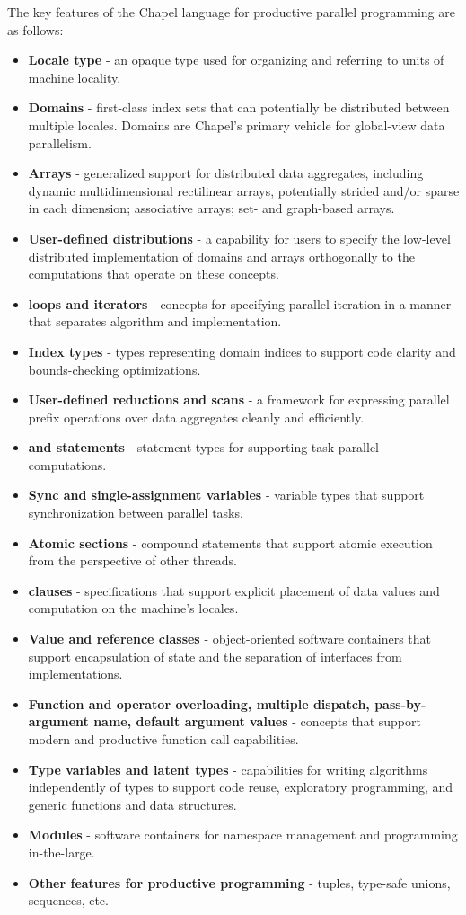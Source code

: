 The key features of the Chapel language for productive parallel programming are as 
follows: 
\begin{itemize}
\item {\bf Locale type} - an opaque type used for organizing and referring to 
units of machine locality.
\item {\bf Domains} - first-class index sets that can potentially be distributed 
between multiple locales.  Domains are Chapel's primary vehicle for global-view 
data parallelism.
\item {\bf Arrays} - generalized support for distributed data aggregates, including 
dynamic multidimensional rectilinear arrays, potentially strided and/or sparse 
in each dimension; associative arrays; set- and graph-based arrays.
\item {\bf User-defined distributions} - a capability for users to specify the 
low-level distributed implementation of domains and arrays orthogonally 
to the computations that operate on these concepts.
\item {\bf {} loops and iterators} - concepts for specifying parallel 
iteration in a manner that separates algorithm and implementation.
\item {\bf Index types} - types representing domain indices to support code 
clarity and bounds-checking optimizations.    
\item {\bf User-defined reductions and scans} - a framework for expressing parallel 
prefix operations over data aggregates cleanly and efficiently.
\item {\bf {} and  statements} - statement types for 
supporting task-parallel computations.
\item {\bf Sync and single-assignment variables} - variable types that support 
synchronization between parallel tasks.
\item {\bf Atomic sections} - compound statements that support atomic execution 
from the perspective of other threads.
\item {\bf {} clauses} - specifications that support explicit placement of 
data values and computation on the machine's locales.
\item {\bf Value and reference classes} - object-oriented software containers 
that support encapsulation of state and the separation of interfaces from 
implementations.
\item {\bf Function and operator overloading, multiple dispatch, pass-by-argument name, 
default argument values} - concepts that support modern and productive function call 
capabilities.
\item {\bf Type variables and latent types} - capabilities for writing algorithms 
independently of types to support code reuse, exploratory programming, and 
generic functions and data structures.
\item {\bf Modules} - software containers for namespace management and programming 
in-the-large.
\item {\bf Other features for productive programming} - tuples, type-safe unions, 
sequences, etc.
\end{itemize}

